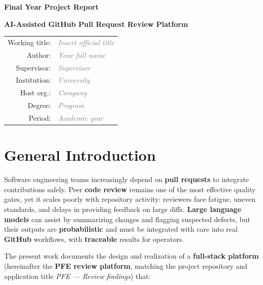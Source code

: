 \documentclass[11pt,a4paper]{report}
\newcommand{\ph}[1]{\textit{\textcolor{gray}{#1}}}
\begin{document}
\begin{titlepage}
\centering\vspace*{2cm}
{\Large\bfseries Final Year Project Report\par}
\vspace{0.75cm}
{\LARGE\bfseries AI-Assisted GitHub Pull Request Review Platform\par}
\vspace{2cm}
\begin{tabular}{rl}
Working title: & \ph{Insert official title} \\
Author: & \ph{Your full name} \\
Supervisor: & \ph{Supervisor} \\
Institution: & \ph{University} \\
Host org.: & \ph{Company} \\
Degree: & \ph{Program} \\
Period: & \ph{Academic year} \\
\end{tabular}
\vfill
\end{titlepage}

\tableofcontents
\listoffigures
\listoftables
\clearpage
{}



\chapter*{General Introduction}


Software engineering teams increasingly depend on \textbf{pull requests} to integrate contributions safely. Peer \textbf{code review} remains one of the most effective quality gates, yet it scales poorly with repository activity: reviewers face fatigue, uneven standards, and delays in providing feedback on large diffs. \textbf{Large language models} can assist by summarizing changes and flagging suspected defects, but their outputs are \textbf{probabilistic} and must be integrated with care into real \textbf{GitHub} workflows, with \textbf{traceable} results for operators.


The present work documents the design and realization of a \textbf{full-stack platform} (hereinafter the \textbf{PFE review platform}, matching the project repository and application title \textit{PFE — Review findings}) that:
\end{document}
